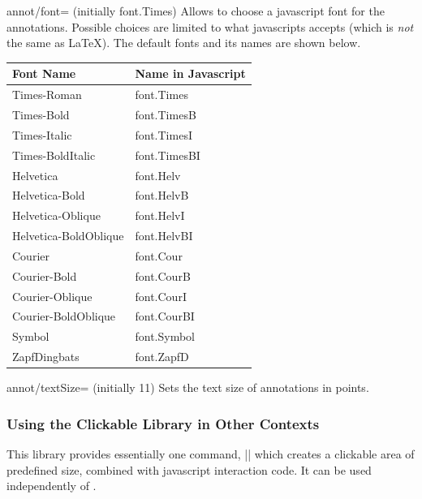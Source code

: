 \begin{pgfplotskey}{annot/font= (initially font.Times)}
	Allows to choose a javascript font for the annotations. Possible choices are limited to what javascripts accepts (which is \emph{not} the same as \LaTeX). The default fonts and its names are shown below.

	\begin{center}
	\begin{tabular}{ll}
		\toprule
		Font Name	& Name in Javascript\\
		\midrule
		Times-Roman           & font.Times\\
        Times-Bold            & font.TimesB\\
        Times-Italic          & font.TimesI\\
        Times-BoldItalic      & font.TimesBI\\
        Helvetica             & font.Helv\\
        Helvetica-Bold        & font.HelvB\\
        Helvetica-Oblique     & font.HelvI\\
        Helvetica-BoldOblique & font.HelvBI\\
        Courier               & font.Cour\\
        Courier-Bold          & font.CourB\\
        Courier-Oblique       & font.CourI\\
        Courier-BoldOblique   & font.CourBI\\
        Symbol                & font.Symbol\\
        ZapfDingbats          & font.ZapfD\\
		\bottomrule
	\end{tabular}
	\end{center}
\end{pgfplotskey}

\begin{pgfplotskey}{annot/textSize= (initially 11)}
	Sets the text size of annotations in points.
\end{pgfplotskey}

\subsubsection{Using the Clickable Library in Other Contexts}
This library provides essentially one command, |\pgfplotsclickablecreate| which creates a clickable area of predefined size, combined with javascript interaction code. It can be used independently of \PGFPlots.

